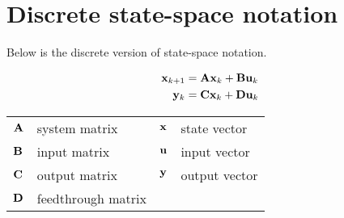 \section{Discrete state-space notation}

Below is the discrete version of state-space notation.
\begin{definition}%
  \begin{align}
    \mathbf{x}_{k+1} &= \mathbf{A}\mathbf{x}_k + \mathbf{B}\mathbf{u}_k \\
    \mathbf{y}_k &= \mathbf{C}\mathbf{x}_k + \mathbf{D}\mathbf{u}_k
  \end{align}
  \begin{figurekey}
    \begin{tabular}{llll}
      $\mathbf{A}$ & system matrix      & $\mathbf{x}$ & state vector \\
      $\mathbf{B}$ & input matrix       & $\mathbf{u}$ & input vector \\
      $\mathbf{C}$ & output matrix      & $\mathbf{y}$ & output vector \\
      $\mathbf{D}$ & feedthrough matrix &  &  \\
    \end{tabular}
  \end{figurekey}
\end{definition}
